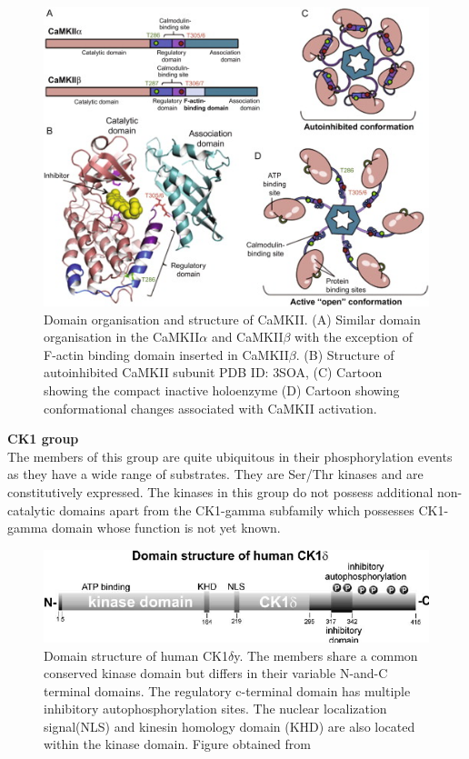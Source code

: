 \documentclass[a4paper, 11pt]{article}
\begin{document}
\begin{figure}[H]
	\includegraphics[width=.8\linewidth]{figures/camk_kinase.jpg}
	\centering
	\caption{Domain organisation and structure of CaMKII. (A) Similar domain organisation in the CaMKII$\alpha$ and CaMKII$\beta$ with the exception of F-actin binding domain inserted in CaMKII$\beta$. (B) Structure of autoinhibited CaMKII subunit PDB ID: 3SOA, (C) Cartoon showing the compact inactive holoenzyme (D) Cartoon showing conformational changes associated with CaMKII activation.}
	\label{camk_kinase}
\end{figure}
\textbf{CK1 group}\\
The members of this group are quite ubiquitous in their phosphorylation events as they have a wide range of substrates. They are Ser/Thr kinases and are constitutively expressed. The kinases in this group do not possess additional non-catalytic domains apart from the CK1-gamma subfamily which possesses CK1-gamma domain whose function is not yet known.\\
\begin{figure}[H]
	\includegraphics[width=.8\linewidth]{figures/ck.jpg}
	\centering
	\caption{Domain structure of human CK1$\delta$y. The members share a common conserved kinase domain but differs in their variable N-and-C terminal domains. The regulatory c-terminal domain has multiple inhibitory autophosphorylation sites. The nuclear localization signal(NLS) and kinesin homology domain (KHD) are also located within the kinase domain. Figure obtained from \cite{knippschild2005role}}
	\label{camk_kinase}
\end{figure}
\end{document}
